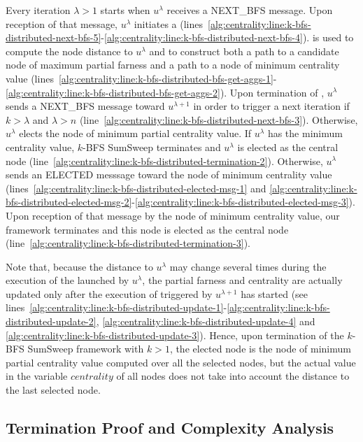 Every iteration $\lambda > 1$ starts when $u^\lambda$ receives a NEXT\_BFS message. Upon reception of that message, $u^\lambda$ initiates a \cheungCbAgg{} (lines~\ref{alg:centrality:line:k-bfs-distributed-next-bfs-5}-\ref{alg:centrality:line:k-bfs-distributed-next-bfs-4}). \cheungCbAgg{} is used to compute the node distance to $u^\lambda$ and to construct both a path to a candidate node of maximum partial farness and a path to a node of minimum centrality value (lines~\ref{alg:centrality:line:k-bfs-distributed-bfs-get-aggs-1}-\ref{alg:centrality:line:k-bfs-distributed-bfs-get-aggs-2}). Upon termination of \cheungCbAgg{}, $u^\lambda$ sends a NEXT\_BFS message toward $u^{\lambda+1}$ in order to trigger a next iteration if $k > \lambda$ and $ \lambda > n$ (line~\ref{alg:centrality:line:k-bfs-distributed-next-bfs-3}). Otherwise, $u^\lambda$ elects the node of minimum partial centrality value. If $u^\lambda$ has the minimum centrality value, $k$-BFS SumSweep terminates and $u^\lambda$ is elected as the central node (line~\ref{alg:centrality:line:k-bfs-distributed-termination-2}). Otherwise, $u^\lambda$ sends an ELECTED messsage toward the node of minimum centrality value (lines~\ref{alg:centrality:line:k-bfs-distributed-elected-msg-1} and \ref{alg:centrality:line:k-bfs-distributed-elected-msg-2}-\ref{alg:centrality:line:k-bfs-distributed-elected-msg-3}). Upon reception of that message by the node of minimum centrality value, our framework terminates and this node is elected as the central node (line~\ref{alg:centrality:line:k-bfs-distributed-termination-3}).

Note that, because the distance to $u^\lambda$ may change several times during the execution of the \cheungCbAgg{} launched by $u^{\lambda}$, the partial farness and centrality are actually updated only after the execution of \cheungCbAgg{} triggered by $u^{\lambda+1}$ has started (see lines~\ref{alg:centrality:line:k-bfs-distributed-update-1}-\ref{alg:centrality:line:k-bfs-distributed-update-2}, \ref{alg:centrality:line:k-bfs-distributed-update-4} and \ref{alg:centrality:line:k-bfs-distributed-update-3}). Hence, upon termination of the $k$-BFS SumSweep framework with $k > 1$, the elected node is the node of minimum partial centrality value computed over all the selected nodes, but the actual value in the variable $centrality$ of all nodes does not take into account the distance to the last selected node.

\subsection{Termination Proof and Complexity Analysis}

